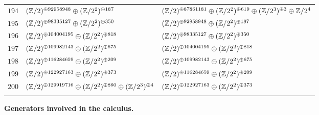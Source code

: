 \begin{supertabular}{|c|p{5.5cm}|p{5.5cm}|}
$194$%
&$(\mathbb{Z}/2)^{\oplus92958948}\oplus(\mathbb{Z}/2^{2})^{\oplus187}$%
&$(\mathbb{Z}/2)^{\oplus87861181}\oplus(\mathbb{Z}/2^{2})^{\oplus619}\oplus(\mathbb{Z}/2^{3})^{\oplus3}\oplus\mathbb{Z}/2^{4}$\\

$195$%
&$(\mathbb{Z}/2)^{\oplus98335127}\oplus(\mathbb{Z}/2^{2})^{\oplus350}$%
&$(\mathbb{Z}/2)^{\oplus92958948}\oplus(\mathbb{Z}/2^{2})^{\oplus187}$\\

$196$%
&$(\mathbb{Z}/2)^{\oplus104004195}\oplus(\mathbb{Z}/2^{2})^{\oplus818}$%
&$(\mathbb{Z}/2)^{\oplus98335127}\oplus(\mathbb{Z}/2^{2})^{\oplus350}$\\

$197$%
&$(\mathbb{Z}/2)^{\oplus109982143}\oplus(\mathbb{Z}/2^{2})^{\oplus675}$%
&$(\mathbb{Z}/2)^{\oplus104004195}\oplus(\mathbb{Z}/2^{2})^{\oplus818}$\\

$198$%
&$(\mathbb{Z}/2)^{\oplus116284659}\oplus(\mathbb{Z}/2^{2})^{\oplus209}$%
&$(\mathbb{Z}/2)^{\oplus109982143}\oplus(\mathbb{Z}/2^{2})^{\oplus675}$\\

$199$%
&$(\mathbb{Z}/2)^{\oplus122927163}\oplus(\mathbb{Z}/2^{2})^{\oplus373}$%
&$(\mathbb{Z}/2)^{\oplus116284659}\oplus(\mathbb{Z}/2^{2})^{\oplus209}$\\

$200$%
&$(\mathbb{Z}/2)^{\oplus129919716}\oplus(\mathbb{Z}/2^{2})^{\oplus860}\oplus(\mathbb{Z}/2^{3})^{\oplus4}$%
&$(\mathbb{Z}/2)^{\oplus122927163}\oplus(\mathbb{Z}/2^{2})^{\oplus373}$\\

&&\\\end{supertabular}
\newpage
{\bf Generators involved in the calculus.\\}

